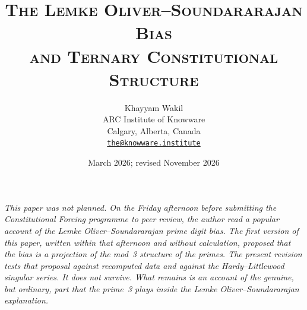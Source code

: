 \documentclass[12pt,a4paper]{article}
\theoremstyle{plain}
\theoremstyle{definition}
\theoremstyle{remark}
\begin{document}

\title{%
  \large\textsc{The Lemke Oliver--Soundararajan Bias}\\[4pt]
  \large\textsc{and Ternary Constitutional Structure}\\[12pt]
}

\author{%
  Khayyam Wakil\\[4pt]
  \small ARC Institute of Knowware\\
  \small Calgary, Alberta, Canada\\
  \small \href{mailto:the@knowware.institute}{\texttt{the@knowware.institute}}
}
\date{March 2026; revised November 2026}

\maketitle

\noindent\emph{This paper was not planned. On the Friday afternoon before
submitting the Constitutional Forcing programme to peer review, the author read a
popular account of the Lemke Oliver--Soundararajan prime digit bias. The first version
of this paper, written within that afternoon and without calculation, proposed that the
bias is a projection of the mod~3 structure of the primes. The present revision tests
that proposal against recomputed data and against the Hardy--Littlewood singular series.
It does not survive. What remains is an account of the genuine, but ordinary, part that
the prime~3 plays inside the Lemke Oliver--Soundararajan explanation.}
\end{document}
